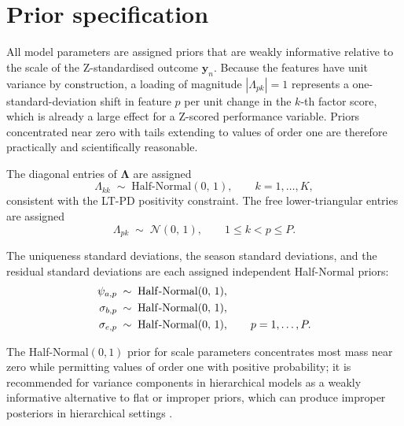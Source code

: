 \section{Prior specification}
\label{sec:priors}

All model parameters are assigned priors that are weakly informative relative to the scale of the Z-standardised outcome $\mathbf{y}_n$. Because the features have unit variance by construction, a loading of magnitude $|\Lambda_{pk}| = 1$ represents a one-standard-deviation shift in feature $p$ per unit change in the $k$-th factor score, which is already a large effect for a Z-scored performance variable. Priors concentrated near zero with tails extending to values of order one are therefore practically and scientifically reasonable.

\begin{definition}
\label{def:prior_lambda}
The diagonal entries of $\boldsymbol{\Lambda}$ are assigned
\begin{equation}
\Lambda_{kk} \;\sim\; \mathrm{Half\text{-}Normal}(0,\, 1), \qquad k = 1, \ldots, K,
\label{eq:prior_lambda_diag}
\end{equation}
consistent with the LT-PD positivity constraint. The free lower-triangular entries are assigned
\begin{equation}
\Lambda_{pk} \;\sim\; \mathcal{N}(0,\, 1), \qquad 1 \leq k < p \leq P.
\label{eq:prior_lambda_off}
\end{equation}
\end{definition}

\begin{definition}
\label{def:prior_variances}
The uniqueness standard deviations, the season standard deviations, and the residual standard deviations are each assigned independent Half-Normal priors:
\begin{align}
\psi_{a,p} &\;\sim\; \mathrm{Half\text{-}Normal}(0,\, 1), \notag \\
\sigma_{b,p} &\;\sim\; \mathrm{Half\text{-}Normal}(0,\, 1), \notag \\
\sigma_{e,p} &\;\sim\; \mathrm{Half\text{-}Normal}(0,\, 1), \qquad p = 1, \ldots, P.
\label{eq:prior_variances}
\end{align}
\end{definition}

The Half-Normal$(0,1)$ prior for scale parameters concentrates most mass near zero while permitting values of order one with positive probability; it is recommended for variance components in hierarchical models as a weakly informative alternative to flat or improper priors, which can produce improper posteriors in hierarchical settings \cite{gelman2006prior}.

